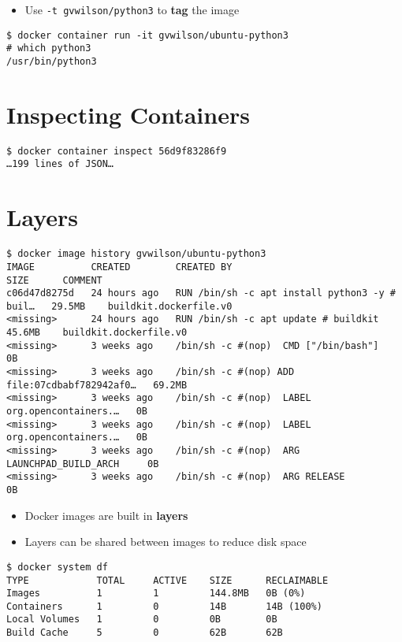 \documentclass[krantzl]{krantz}
\newcommand{\glossref}[1]{\textbf{#1}}
\begin{document}
\begin{itemize}
\item Use \texttt{-t gvwilson/python3} to \glossref{tag} the image

\end{itemize}
\begin{lstlisting}[frame=tblr,backgroundcolor=\color{black!5}]
$ docker container run -it gvwilson/ubuntu-python3
# which python3
/usr/bin/python3
\end{lstlisting}

\section{Inspecting Containers}
\begin{lstlisting}[frame=tblr,backgroundcolor=\color{black!5}]
$ docker container inspect 56d9f83286f9
…199 lines of JSON…
\end{lstlisting}

\section{Layers}
\begin{lstlisting}[frame=tblr,backgroundcolor=\color{black!5}]
$ docker image history gvwilson/ubuntu-python3
IMAGE          CREATED        CREATED BY                                      SIZE      COMMENT
c06d47d8275d   24 hours ago   RUN /bin/sh -c apt install python3 -y # buil…   29.5MB    buildkit.dockerfile.v0
<missing>      24 hours ago   RUN /bin/sh -c apt update # buildkit            45.6MB    buildkit.dockerfile.v0
<missing>      3 weeks ago    /bin/sh -c #(nop)  CMD ["/bin/bash"]            0B
<missing>      3 weeks ago    /bin/sh -c #(nop) ADD file:07cdbabf782942af0…   69.2MB
<missing>      3 weeks ago    /bin/sh -c #(nop)  LABEL org.opencontainers.…   0B
<missing>      3 weeks ago    /bin/sh -c #(nop)  LABEL org.opencontainers.…   0B
<missing>      3 weeks ago    /bin/sh -c #(nop)  ARG LAUNCHPAD_BUILD_ARCH     0B
<missing>      3 weeks ago    /bin/sh -c #(nop)  ARG RELEASE                  0B
\end{lstlisting}

\begin{itemize}
\item Docker images are built in \glossref{layers}

\item Layers can be shared between images to reduce disk space

\end{itemize}
\begin{lstlisting}[frame=tblr,backgroundcolor=\color{black!5}]
$ docker system df
TYPE            TOTAL     ACTIVE    SIZE      RECLAIMABLE
Images          1         1         144.8MB   0B (0%)
Containers      1         0         14B       14B (100%)
Local Volumes   1         0         0B        0B
Build Cache     5         0         62B       62B
\end{lstlisting}
\end{document}
